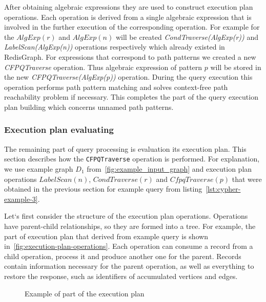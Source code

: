 After obtaining algebraic expressions they are used to construct execution plan operations. Each operation is derived from a single algebraic expression that is involved in the further execution of the corresponding operation. For example for the $AlgExp(r)$ and $AlgExp(n)$ will be created \textit{CondTraverse(AlgExp(r))} and \textit{LabelScan(AlgExp(n))} operations respectively which already existed in RedisGraph. For expressions that correspond to path patterns we created a new \textit{CFPQTraverse} operation. Thus algebraic expression of pattern $p$ will be stored in the new \textit{CFPQTraverse(AlgExp(p))} operation. During the query execution this operation performs path pattern matching and solves context-free path reachability problem if necessary. This completes the part of the query execution plan building which concerns unnamed path patterns.


\subsubsection{Execution plan evaluating}
\label{subsubsec:execution-plan-evaluating}

The remaining part of query processing is evaluation its execution plan. This section describes how the \lstinline{CFPQTraverse} operation is performed. For explanation, we use example graph $D_1$ from~\autoref{fig:example_input_graph} and execution plan operations $LabelScan(n)$, $CondTraverse(r)$ and $CfpqTraverse(p)$ that were obtained in the previous section for example query from listing~\autoref{lst:cypher-example-3}.

Let`s first consider the structure of the execution plan operations. Operations have parent-child relationships, so they are formed into a tree. For example, the part of execution plan that derived from example query is shown in~\autoref{fig:execution-plan-operations}. Each operation can consume a record from a child operation, process it and produce another one for the parent. Records contain information necessary for the parent operation, as well as everything to restore the response, such as identifiers of accumulated vertices and edges.

\begin{figure}[h]
    \centering        
    \caption{Example of part of the execution plan}
    \label{fig:execution-plan-operations}
\end{figure}


